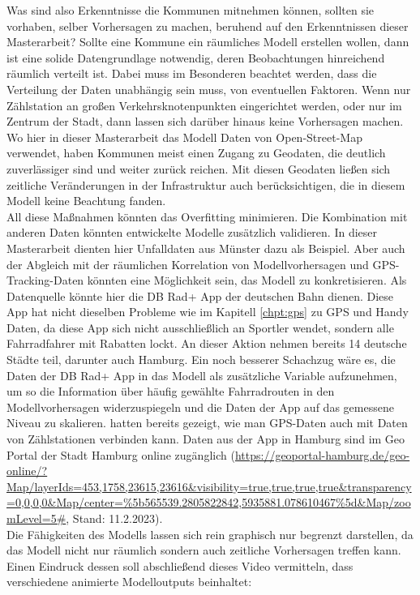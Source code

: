 \documentclass[a4paper,12pt]{thesis}
\begin{document}
Was sind also Erkenntnisse die Kommunen mitnehmen können, sollten sie vorhaben, selber Vorhersagen zu machen, beruhend auf den Erkenntnissen dieser Masterarbeit? Sollte eine Kommune ein räumliches Modell erstellen wollen, dann ist eine solide Datengrundlage notwendig, deren Beobachtungen hinreichend räumlich verteilt ist. Dabei muss im Besonderen beachtet werden, dass die Verteilung der Daten unabhängig sein muss, von eventuellen Faktoren. Wenn nur Zählstation an großen Verkehrsknotenpunkten eingerichtet werden, oder nur im Zentrum der Stadt, dann lassen sich darüber hinaus keine Vorhersagen machen. Wo hier in dieser Masterarbeit das Modell Daten von Open-Street-Map verwendet, haben Kommunen meist einen Zugang zu Geodaten, die deutlich zuverlässiger sind und weiter zurück reichen. Mit diesen Geodaten ließen sich zeitliche Veränderungen in der Infrastruktur auch berücksichtigen, die in diesem Modell keine Beachtung fanden.\\
All diese Maßnahmen könnten das Overfitting minimieren. Die Kombination mit anderen Daten könnten entwickelte Modelle zusätzlich validieren. In dieser Masterarbeit dienten hier Unfalldaten aus Münster dazu als Beispiel. Aber auch der Abgleich mit der räumlichen Korrelation von Modellvorhersagen und GPS-Tracking-Daten könnten eine Möglichkeit sein, das Modell zu konkretisieren. Als Datenquelle könnte hier die DB Rad+ App der deutschen Bahn dienen. Diese App hat nicht dieselben Probleme wie im Kapitell \ref{chpt:gps} zu GPS und Handy Daten, da diese App sich nicht ausschließlich an Sportler wendet, sondern alle Fahrradfahrer mit Rabatten lockt. An dieser Aktion nehmen bereits 14 deutsche Städte teil, darunter auch Hamburg. Ein noch besserer Schachzug wäre es, die Daten der DB Rad+ App in das Modell als zusätzliche Variable aufzunehmen, um so die Information über häufig gewählte Fahrradrouten in den Modellvorhersagen widerzuspiegeln und die Daten der App auf das gemessene Niveau zu skalieren. \cite{Alattar2021} hatten bereits gezeigt, wie man GPS-Daten auch mit Daten von Zählstationen verbinden kann. Daten aus der App in Hamburg sind im Geo Portal der Stadt Hamburg online zugänglich  (\url{https://geoportal-hamburg.de/geo-online/?Map/layerIds=453,1758,23615,23616&visibility=true,true,true,true&transparency=0,0,0,0&Map/center=%5b565539.2805822842,5935881.078610467%5d&Map/zoomLevel=5#}, Stand: 11.2.2023).\\

Die Fähigkeiten des Modells lassen sich rein graphisch nur begrenzt darstellen, da das Modell nicht nur räumlich sondern auch zeitliche Vorhersagen treffen kann. Einen Eindruck dessen soll abschließend dieses Video vermitteln, dass verschiedene animierte Modelloutputs beinhaltet:
\end{document}
